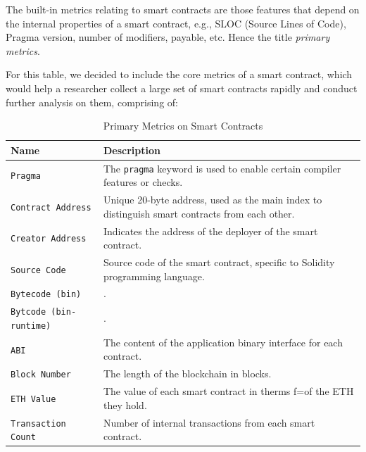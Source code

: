         The built-in metrics relating to smart contracts are those features that depend on the internal properties of a smart contract, e.g., SLOC (Source Lines of Code), Pragma version, number of modifiers, payable, etc. Hence the title \emph{primary metrics}.

        For this table, we decided to include the core metrics of a smart contract, which would help a researcher collect a large set of smart contracts rapidly and conduct further analysis on them, comprising of:

        \begin{table}[H]
            \caption{Primary Metrics on Smart Contracts}
            \label{tab:intrinsic-cues}
            \centering
            \begin{adjustbox}{width=1\textwidth}
            \def\arraystretch{1.3}
            \begin{tabular}{l|p{105mm}}
                \textbf{Name} & \textbf{Description} \\
                \hline
                \verb|Pragma| & The \verb|pragma| keyword is used to enable certain compiler features or checks.~\cite{pragmadocs}\\
                \verb|Contract Address| & Unique 20-byte address, used as the main index to distinguish smart contracts from each other. \\
                \verb|Creator Address| & Indicates the address of the deployer of the smart contract. \\
                \verb|Source Code| & Source code of the smart contract, specific to Solidity programming language. \\
                \verb|Bytecode (bin)| & . \\
                \verb|Bytcode (bin-runtime)| & . \\
                \verb|ABI| & The content of the application binary interface for each contract. \\
                \verb|Block Number| & The length of the blockchain in blocks. \\
                \verb|ETH Value| & The value of each smart contract in therms f=of the ETH they hold. \\
                \verb|Transaction Count| & Number of internal transactions from each smart contract. \\
            \end{tabular}
            \end{adjustbox}
    \end{table}

